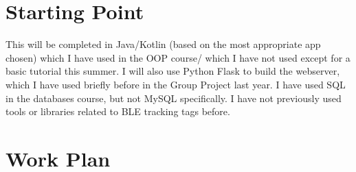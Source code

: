 \documentclass{article}
\begin{document}
\section{Starting Point}


This will be completed in Java/Kotlin (based on the most appropriate app chosen) which I have used in the OOP course/ which I have not used except for a basic tutorial this summer.
I will also use Python Flask to build the webserver, which I have used briefly before in the Group Project last year. I have used SQL in the databases course, but not MySQL specifically. I have not previously used tools or libraries related to BLE tracking tags before.


\section{Work Plan}
\pagebreak
\end{document}
